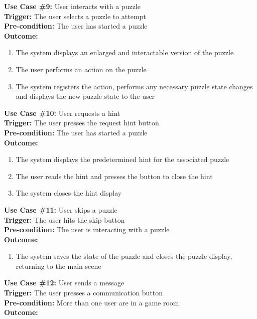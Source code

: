 \documentclass[12pt]{article}
\begin{document}
\textbf{Use Case \#9:} User interacts with a puzzle\\
\textbf{Trigger:} The user selects a puzzle to attempt\\
\textbf{Pre-condition:} The user has started a puzzle\\
\textbf{Outcome:}
\begin{enumerate} %
	\item The system displays an enlarged and interactable version of the puzzle
	\item The user performs an action on the puzzle
	\item The system registers the action, performs any necessary puzzle state changes and displays the new puzzle state to the user    
\end{enumerate}
\textbf{Use Case \#10:} User requests a hint\\
\textbf{Trigger:} The user presses the request hint button\\
\textbf{Pre-condition:} The user has started a puzzle\\
\textbf{Outcome:}
\begin{enumerate}
	\item The system displays the predetermined hint for the associated puzzle
	\item The user reads the hint and presses the button to close the hint
	\item The system closes the hint display
\end{enumerate}
\textbf{Use Case \#11:} User skips a puzzle\\
\textbf{Trigger:} The user hits the skip button\\
\textbf{Pre-condition:} The user is interacting with a puzzle\\
\textbf{Outcome:}
\begin{enumerate}
	\item The system saves the state of the puzzle and closes the puzzle display, returning to the main scene
\end{enumerate}
\textbf{Use Case \#12:} User sends a message\\
\textbf{Trigger:} The user presses a communication button\\
\textbf{Pre-condition:} More than one user are in a game room\\
\textbf{Outcome:}
\end{document}
